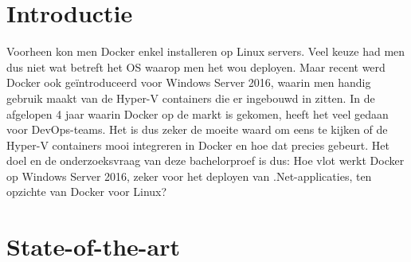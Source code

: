 \documentclass[fleqn,10pt]{voorstel}
\affiliation{\textbf{Contact:}
	\textsuperscript{1} \href{mailto:stephan.heirbaut.w1409@student.hogent.be}{stephan.heirbaut.w1409@student.hogent.be}}
\begin{document}
	
	\flushbottom %
	\maketitle %
	\tableofcontents %
	\thispagestyle{empty} %
	
	
	
	\section{Introductie} %
	\label{sec:introductie}
	
	Voorheen kon men Docker enkel installeren op Linux servers. Veel keuze had men dus niet wat betreft het OS waarop men het wou deployen. Maar recent werd Docker ook geïntroduceerd voor Windows Server 2016, waarin men handig gebruik maakt van de Hyper-V containers die er ingebouwd in zitten.
	In de afgelopen 4 jaar waarin Docker op de markt is gekomen, heeft het veel gedaan voor DevOps-teams. Het is dus zeker de moeite waard om eens te kijken of de Hyper-V containers mooi integreren in Docker en hoe dat precies gebeurt.
	Het doel en de onderzoeksvraag van deze bachelorproef is dus: Hoe vlot werkt Docker op Windows Server 2016, zeker voor het deployen van .Net-applicaties, ten opzichte van Docker voor Linux?
	
	
	\section{State-of-the-art}
	\label{sec:state-of-the-art}
	
\end{document}

